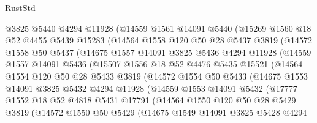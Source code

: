 \begin{lexlean}{RustStd}
\begin{coremodule}
        @3825
        @5440
        @4294
        @11928
        (@14559
          @1561
          @14091
          @5440
          (@15269
            @1560
            @18
            @52
            @4455
            @5439
            @15283
            (@14564
              @1558
              @120
              @50
              @28
              @5437
              @3819
              (@14572
                @1558
                @50
                @5437
                (@14675
                  @1557
                  @14091
                  @3825
                  @5436
                  @4294
                  @11928
                  (@14559
                    @1557
                    @14091
                    @5436
                    (@15507
                      @1556
                      @18
                      @52
                      @4476
                      @5435
                      @15521
                      (@14564
                        @1554
                        @120
                        @50
                        @28
                        @5433
                        @3819
                        (@14572
                          @1554
                          @50
                          @5433
                          (@14675
                            @1553
                            @14091
                            @3825
                            @5432
                            @4294
                            @11928
                            (@14559
                              @1553
                              @14091
                              @5432
                              (@17777
                                @1552
                                @18
                                @52
                                @4818
                                @5431
                                @17791
                                (@14564
                                  @1550
                                  @120
                                  @50
                                  @28
                                  @5429
                                  @3819
                                  (@14572
                                    @1550
                                    @50
                                    @5429
                                    (@14675
                                      @1549
                                      @14091
                                      @3825
                                      @5428
                                      @4294

\end{coremodule}
\end{lexlean}
